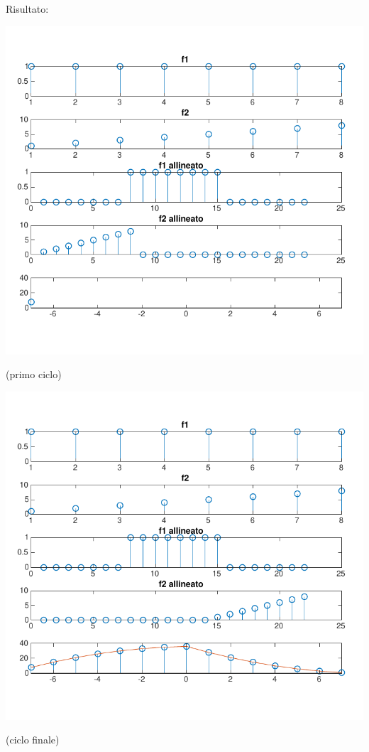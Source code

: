 \documentclass[a4paper, 10pt]{report}
\begin{document}
\noindent Risultato:
\begin{center}
\includegraphics[scale=1]{es2pt1.pdf}

(primo ciclo)

\includegraphics[scale=1]{es2pt3.pdf}

(ciclo finale)
\end{center}
\end{document}
